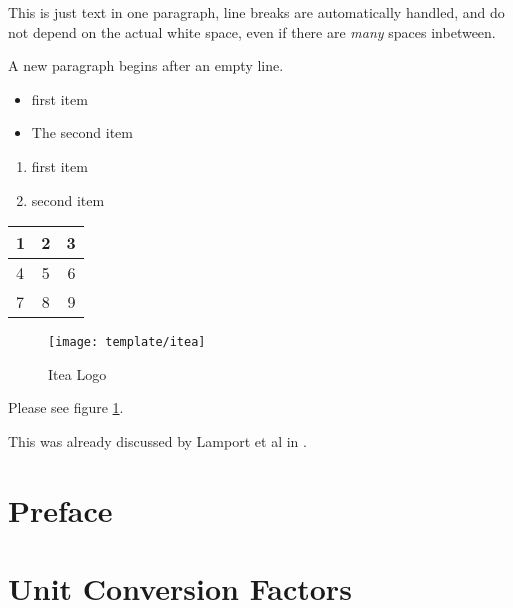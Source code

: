 \documentclass{template/openetcs_article}
\begin{document}
This is just text in one paragraph, line breaks are automatically handled, and do not depend on the actual
white
space, even if there are \emph{many}                                  spaces                            inbetween.


A new paragraph begins after an empty line.

\begin{itemize}
  \item first item
  \item The second item
\end{itemize}

\begin{enumerate}
  \item first item
  \item second item
\end{enumerate}

  \begin{tabular}{|  l | c || r | }
    \hline
    1 & 2 & 3 \\ \hline
    4 & 5 & 6 \\ \hline
    7 & 8 & 9 \\
    \hline
  \end{tabular}

\begin{figure}
  \centering
  \texttt{[image: template/itea]}
  \caption{Itea Logo}
  \label{fig:itea2}
\end{figure}

Please see figure \ref{fig:itea2}.

This was already discussed by Lamport et al in \cite{lamport94}.





\section{Preface}
\lipsum[1-5]

\section{Unit Conversion Factors}
\end{document}
